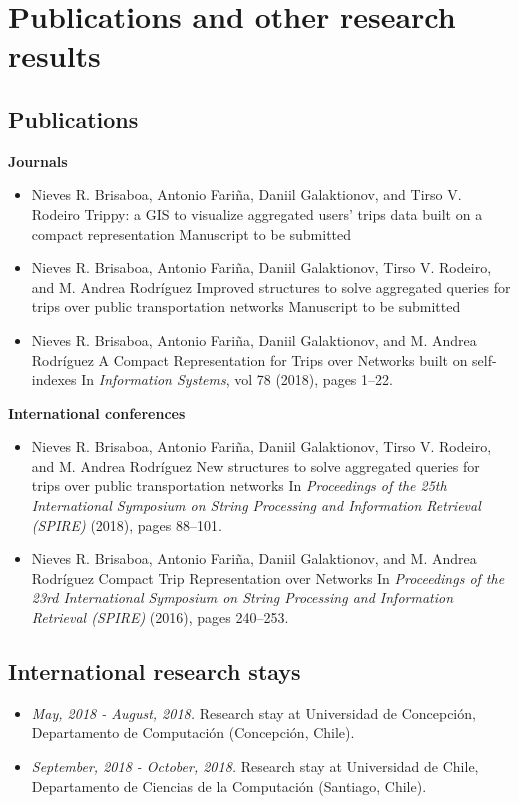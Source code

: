 \chapter{Publications and other research results}
\label{ch:appendix-publications}


\section*{Publications}

{\noindent \bfseries Journals}
\begin{itemize}
    \item Nieves R. Brisaboa, Antonio Fari\~na, Daniil Galaktionov, and Tirso V. Rodeiro
	Trippy: a GIS to visualize aggregated users' trips data built on a compact representation
	Manuscript to be submitted

    \item Nieves R. Brisaboa, Antonio Fari\~na, Daniil Galaktionov, Tirso V. Rodeiro, and M. Andrea Rodr\'iguez
	Improved structures to solve aggregated queries for trips over public transportation networks
	Manuscript to be submitted

	\item Nieves R. Brisaboa, Antonio Fari\~na, Daniil Galaktionov, and M. Andrea Rodr\'iguez
	A Compact Representation for Trips over Networks built on self-indexes
	In \textit{Information Systems}, vol 78 (2018), pages 1--22.
\end{itemize}


{\noindent \bfseries International conferences}

\begin{itemize}
	\item Nieves R. Brisaboa, Antonio Fari\~na, Daniil Galaktionov, Tirso V. Rodeiro, and M. Andrea Rodr\'iguez
	New structures to solve aggregated queries for trips over public transportation networks
	In \textit{Proceedings of the 25th International Symposium on String Processing and Information Retrieval (SPIRE)} (2018), pages 88--101.
	
	\item Nieves R. Brisaboa, Antonio Fari\~na, Daniil Galaktionov, and M. Andrea Rodr\'iguez
	Compact Trip Representation over Networks
	In \textit{Proceedings of the 23rd International Symposium on String Processing and Information Retrieval (SPIRE)} (2016), pages 240--253.
\end{itemize}

\section*{International research stays}

\begin{itemize}

    \item {\itshape May, 2018 - August, 2018.} Research stay at Universidad de Concepci\'on,
Departamento de Computaci\'on (Concepci\'on, Chile).

	\item {\itshape September, 2018 - October, 2018.} Research stay at Universidad de Chile,
Departamento de Ciencias de la Computaci\'on (Santiago, Chile).

\end{itemize}
